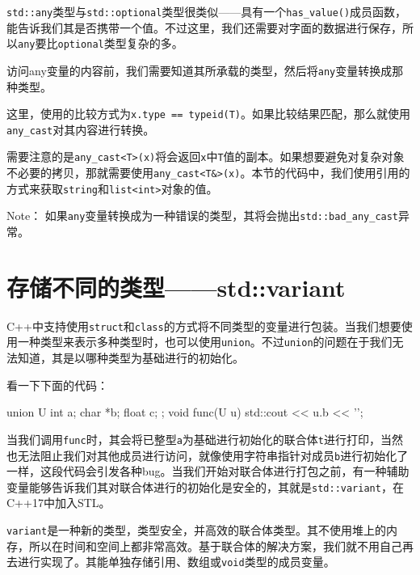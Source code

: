 
\texttt{std::any}类型与\texttt{std::optional}类型很类似——具有一个\texttt{has\_value()}成员函数，能告诉我们其是否携带一个值。不过这里，我们还需要对字面的数据进行保存，所以\texttt{any}要比\texttt{optional}类型复杂的多。

访问any变量的内容前，我们需要知道其所承载的类型，然后将\texttt{any}变量转换成那种类型。

这里，使用的比较方式为\texttt{x.type == typeid(T)}。如果比较结果匹配，那么就使用\texttt{any\_cast}对其内容进行转换。

需要注意的是\texttt{any\_cast<T>(x)}将会返回\texttt{x}中\texttt{T}值的副本。如果想要避免对复杂对象不必要的拷贝，那就需要使用\texttt{any\_cast<T\&>(x)}。本节的代码中，我们使用引用的方式来获取\texttt{string}和\texttt{list<int>}对象的值。

\begin{myInfoBox}
Note： 如果\texttt{any}变量转换成为一种错误的类型，其将会抛出\texttt{std::bad\_any\_cast}异常。
\end{myInfoBox}


\section{存储不同的类型——std::variant}

C++中支持使用\texttt{struct}和\texttt{class}的方式将不同类型的变量进行包装。当我们想要使用一种类型来表示多种类型时，也可以使用\texttt{union}。不过\texttt{union}的问题在于我们无法知道，其是以哪种类型为基础进行的初始化。

看一下下面的代码：

\begin{codebox}[cpp]
union U {
    int a;
    char *b;
    float c;
};
void func(U u) { std::cout << u.b << '\n'; }    
\end{codebox}

当我们调用\texttt{func}时，其会将已整型\texttt{a}为基础进行初始化的联合体\texttt{t}进行打印，当然也无法阻止我们对其他成员进行访问，就像使用字符串指针对成员\texttt{b}进行初始化了一样，这段代码会引发各种bug。当我们开始对联合体进行打包之前，有一种辅助变量能够告诉我们其对联合体进行的初始化是安全的，其就是\texttt{std::variant}，在C++17中加入STL。

\texttt{variant}是一种新的类型，类型安全，并高效的联合体类型。其不使用堆上的内存，所以在时间和空间上都非常高效。基于联合体的解决方案，我们就不用自己再去进行实现了。其能单独存储引用、数组或\texttt{void}类型的成员变量。

